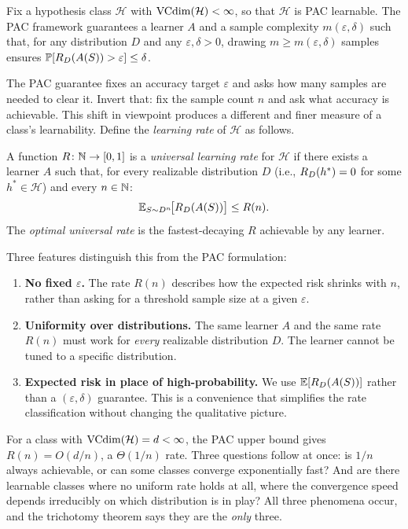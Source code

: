 Fix a hypothesis class $\mathcal{H}$ with $\mathrm{VCdim}(\mathcal{H}) < \infty$, so
that $\mathcal{H}$ is PAC learnable.  The PAC framework guarantees a learner
$A$ and a sample complexity $m(\varepsilon, \delta)$ such that, for any
distribution $D$ and any $\varepsilon, \delta > 0$, drawing
$m \geq m(\varepsilon, \delta)$ samples ensures
$\mathbb{P}[R_D(A(S)) > \varepsilon] \leq \delta$.

The PAC guarantee fixes an accuracy target $\varepsilon$ and asks how many
samples are needed to clear it.  Invert that: fix the sample count $n$ and
ask what accuracy is achievable.  This shift in viewpoint produces a
different and finer measure of a class's learnability.  Define the
\emph{learning rate} of $\mathcal{H}$ as follows.

\begin{defn}
\label{def:universal-rate}
A function $R \colon \mathbb{N} \to [0,1]$ is a \emph{universal learning rate} for
$\mathcal{H}$ if there exists a learner $A$ such that, for every realizable
distribution $D$ (i.e., $R_D(h^*) = 0$ for some $h^* \in \mathcal{H}$)
and every $n \in \mathbb{N}$:
\[
  \mathbb{E}_{S \sim D^n}\!\bigl[R_D(A(S))\bigr] \leq R(n).
\]
The \emph{optimal universal rate} is the fastest-decaying $R$ achievable by
any learner.
\end{defn}

Three features distinguish this from the PAC formulation:

\begin{enumerate}[leftmargin=*,itemsep=3pt]
\item \textbf{No fixed $\varepsilon$.}  The rate $R(n)$ describes how the
  expected risk shrinks with $n$, rather than asking for a threshold sample
  size at a given $\varepsilon$.

\item \textbf{Uniformity over distributions.}  The same learner $A$ and the
  same rate $R(n)$ must work for \emph{every} realizable distribution $D$.
  The learner cannot be tuned to a specific distribution.

\item \textbf{Expected risk in place of high-probability.}  We use
  $\mathbb{E}[R_D(A(S))]$ rather than a $(\varepsilon,\delta)$ guarantee.  This
  is a convenience that simplifies the rate classification without changing
  the qualitative picture.
\end{enumerate}

For a class with $\mathrm{VCdim}(\mathcal{H}) = d < \infty$, the PAC upper bound gives
$R(n) = O(d/n)$, a $\Theta(1/n)$ rate.  Three questions follow at once:
is $1/n$ always achievable, or can some classes converge exponentially fast?
And are there learnable classes where no uniform rate holds at all, where the
convergence speed depends irreducibly on which distribution is in play?
All three phenomena occur, and the trichotomy theorem says they are the
\emph{only} three.



